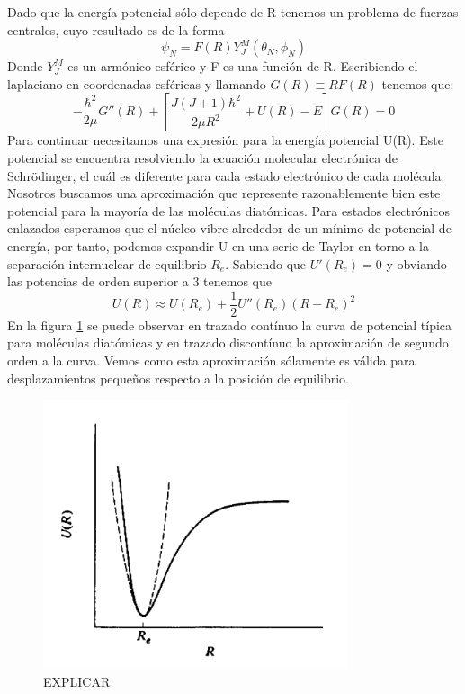 \documentclass[a4paper]{article}
\begin{document}
Dado que la energía potencial sólo depende de R tenemos un problema de fuerzas centrales, cuyo resultado es de la forma
\begin{equation}
\psi_N=F(R)Y^M_J(\theta_N,\phi_N)
\end{equation}
Donde $Y^M_J$ es un armónico esférico y F es una función de R.
Escribiendo el laplaciano en coordenadas esféricas y llamando $G(R)\equiv RF(R)$ tenemos que:
\begin{equation}
-\frac{\hbar^2}{2\mu}G''(R)+\left[\frac{J(J+1)\hbar^2}{2\mu R^2}+U(R)-E\right]G(R)=0
\end{equation}
Para continuar necesitamos una expresión para la energía potencial U(R). Este potencial se encuentra resolviendo la ecuación molecular electrónica de Schrödinger, el cuál es diferente para cada estado electrónico de cada molécula. Nosotros buscamos una aproximación que represente razonablemente bien este potencial para la mayoría de las moléculas diatómicas. Para estados electrónicos enlazados esperamos que el núcleo vibre alrededor de un mínimo de potencial de energía, por tanto, podemos expandir U en una serie de Taylor en torno a la separación internuclear de equilibrio $R_e$. Sabiendo que $U'(R_e)=0$ y obviando las potencias de orden superior a 3 tenemos que
\begin{equation}
U(R) \approx U(R_e)+\frac{1}{2}U''(R_e)(R-R_e)^2
\end{equation}
En la figura \ref{potencial} se puede observar en trazado contínuo la curva de potencial típica para moléculas diatómicas y en trazado discontínuo la aproximación de segundo orden a la curva. Vemos como esta aproximación sólamente es válida para desplazamientos pequeños respecto a la posición de equilibrio.
\begin{figure}
\includegraphics[width=0.8\textwidth]{curva_potencial.png}
\caption{EXPLICAR}
\label{potencial}
\end{figure}
\end{document}
